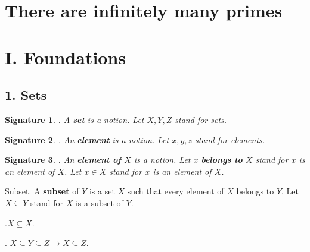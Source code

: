 \newtheorem{signature}{Signature} 
\newtheorem{axiom}{Axiom} 
\newcommand{\power}{{\cal P}} 
\newcommand{\preimg}[2]{{#1}^{-1}[#2]} 
\newcommand{\Seq}[2]{\{#1,\dots,#2\}}
\newcommand{\Set}[3]{\{#1_{#2},\dots,#1_{#3}\}}
\newcommand{\Product}[3]{\prod_{i=#2}^{#3}{#1}_i}
\newcommand{\subs}[2]{{#1}_{#2}}
\newcommand{\CC}{{\Bbb C}}
\newcommand{\RR}{{\Bbb R}}
\newcommand{\QQ}{{\Bbb Q}}
\newcommand{\ZZ}{{\Bbb Z}} 
\newcommand{\NN}{{\Bbb N}}

\section{There are infinitely many primes}
\section{I. Foundations}


\subsection{1. Sets}


\begin{signature}.
A {\bf set} is a notion.
Let $X,Y,Z$ stand for sets. 
\end{signature}

\begin{signature}.
An {\bf element} is a notion.
Let $x,y,z$ stand for elements.
\end{signature}

\begin{signature}.
An {\bf element of} $X$ is a notion.
Let $x$ {\bf belongs to} $X$ stand for $x$ is an element of $X$.
Let $x \in X$ stand for $x$ is an element of $X$.
\end{signature}

\begin{definition} Subset.
A {\bf subset} of $Y$ is a set $X$ such that
every element of $X$ belongs to $Y$.
Let $X \subseteq Y$ stand for $X$ is a subset of $Y$.
\end{definition}

\begin{lemma}.$X \subseteq X$.\end{lemma}

\begin{lemma}.
$X \subseteq Y \subseteq Z  \rightarrow  X \subseteq Z$.
\end{lemma}

